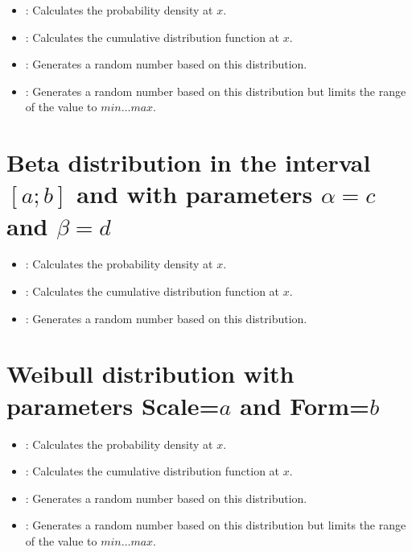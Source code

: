 \begin{itemize}

\item
{}:
Calculates the probability density at $x$.

\item
{}:
Calculates the cumulative distribution function at $x$.

\item
{}:
Generates a random number based on this distribution.

\item
{}:
Generates a random number based on this distribution but limits the range of the value to $min\ldots max$.

\end{itemize}



\section{Beta distribution in the interval \texorpdfstring{$[a;b]$}{[a;b]} and with parameters \texorpdfstring{$\alpha=c$}{c} and \texorpdfstring{$\beta=d$}{d}}

\begin{itemize}

\item
{}:
Calculates the probability density at $x$.

\item
{}:
Calculates the cumulative distribution function at $x$.

\item
{}:
Generates a random number based on this distribution.

\end{itemize}



\section{Weibull distribution with parameters Scale=\texorpdfstring{$a$}{a} and Form=\texorpdfstring{$b$}{b}}

\begin{itemize}

\item
{}:
Calculates the probability density at $x$.

\item
{}:
Calculates the cumulative distribution function at $x$.

\item
{}:
Generates a random number based on this distribution.

\item
{}:
Generates a random number based on this distribution but limits the range of the value to $min\ldots max$.

\end{itemize}



